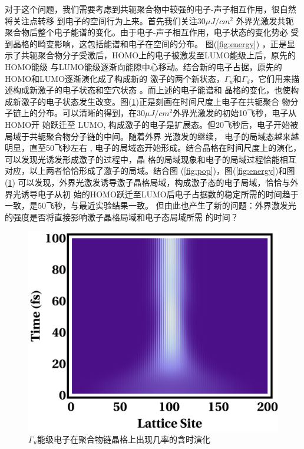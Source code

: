 \documentclass[12pt,]{report}
\begin{document}
对于这个问题，我们需要考虑到共轭聚合物中较强的电子-声子相互作用，很自然将关注点转移
到电子的空间行为上来。首先我们关注\(30\mu J/cm^2\)
外界光激发共轭聚合物后整个电子能谱的变化。由于电子-声子相互作用，电子状态的变化势必
受到晶格的畸变影响，这包括能谱和电子在空间的分布。 图(\ref{fig:energy})
，正是显示了共轭聚合物分子受激后，HOMO上的电子被激发至LUMO能级上后，原先的HOMO能级
与LUMO能级逐渐向能隙中心移动。结合新的电子占据，原先的HOMO和LUMO逐渐演化成了构成新的
激子的两个新状态，\(\Gamma_u\)和\(\Gamma_d\)，它们用来描述构成新激子的电子状态和空穴状态
。而上述的电子能谱和
晶格的变化，也使构成新激子的电子状态发生改变。图(\ref{fig:wavefun})正是刻画在时间尺度上电子在共轭聚合
物分子链上的分布。可以清晰的得到，在\(30\mu J/cm^2\)外界光激发的初始10飞秒，电子从HOMO开
始跃迁至 LUMO,
构成激子的电子是扩展态。但20飞秒后，电子开始被局域于共轭聚合物分子链的中间。随着外界
光激发的继续， 电子的局域态越来越明显，直至50飞秒左右 ,
电子的局域态开始形成。结合晶格在时间尺度上的演化，可以发现光诱发形成激子的过程中，晶
格的局域现象和电子的局域过程恰能相互对应，以上两者恰恰形成了激子的局域。结合图
(\ref{fig:pop})，图(\ref{fig:energy})和图 (\ref{fig:wavefun})
可以发现，外界光激发诱导激子晶格局域，构成激子态的电子局域，恰恰与外界光诱导电子从初
始的HOMO跃迁至LUMO后电子占据数的稳定所需的时间趋于一致，是50飞秒，与最近实验结果一致。
但由此也产生了新的问题：外界激发光的强度是否将直接影响激子晶格局域和电子态局域所需
的时间？

\begin{figure}[h!] 
    \centering
    \includegraphics[scale=1]{./figures/Exciton_Figure_6.png}
    \caption{$\Gamma_u$能级电子在聚合物链晶格上出现几率的含时演化}
    \label{fig:wavefun}
\end{figure}
\end{document}
